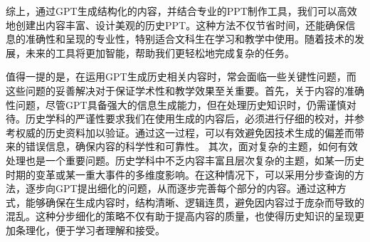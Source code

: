 

综上，通过GPT生成结构化的内容，并结合专业的PPT制作工具，我们可以高效地创建出内容丰富、设计美观的历史PPT。这种方法不仅节省时间，还能确保信息的准确性和呈现的专业性，特别适合文科生在学习和教学中使用。随着技术的发展，未来的工具将更加智能，帮助我们更轻松地完成复杂的任务。

值得一提的是，在运用GPT生成历史相关内容时，常会面临一些关键性问题，而这些问题的妥善解决对于保证学术性和教学效果至关重要。首先，关于内容的准确性问题，尽管GPT具备强大的信息生成能力，但在处理历史知识时，仍需谨慎对待。历史学科的严谨性要求我们在使用生成的内容后，必须进行仔细的校对，并参考权威的历史资料加以验证。通过这一过程，可以有效避免因技术生成的偏差而带来的错误信息，确保内容的科学性和可靠性。
其次，面对复杂的主题，如何有效处理也是一个重要问题。历史学科中不乏内容丰富且层次复杂的主题，如某一历史时期的变革或某一重大事件的多维度影响。在这种情况下，可以采用分步查询的方法，逐步向GPT提出细化的问题，从而逐步完善每个部分的内容。通过这种方式，能够确保在生成内容时，结构清晰、逻辑连贯，避免因内容过于庞杂而导致的混乱。这种分步细化的策略不仅有助于提高内容的质量，也使得历史知识的呈现更加条理化，便于学习者理解和接受。
